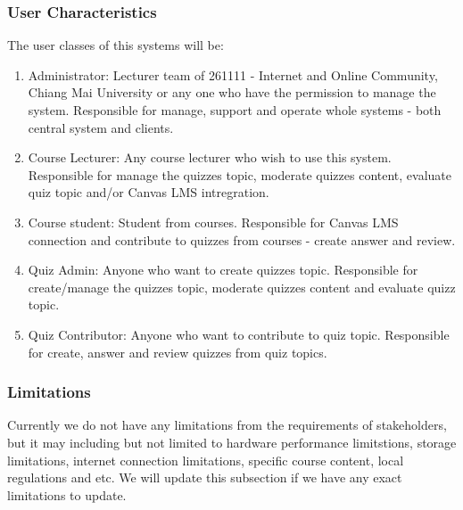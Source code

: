 \documentclass[ 10pt]{report}
\begin{document}
            \subsubsection{User Characteristics}
            The user classes of this systems will be:
            \begin{enumerate}
                \item Administrator: Lecturer team of 261111 - Internet and Online Community, Chiang Mai University or any one who have the permission to manage the system. Responsible for manage, support and operate whole systems - both central system and clients.
                \item Course Lecturer: Any course lecturer who wish to use this system. Responsible for manage the quizzes topic, moderate quizzes content, evaluate quiz topic and/or Canvas LMS intregration.
                \item Course student: Student from courses. Responsible for Canvas LMS connection and contribute to quizzes from courses - create answer and review.  
                \item Quiz Admin: Anyone who want to create quizzes topic. Responsible for create/manage the quizzes topic, moderate quizzes content and evaluate quizz topic.
                \item Quiz Contributor: Anyone who want to contribute to quiz topic. Responsible for create, answer and review quizzes from quiz topics.
            \end{enumerate}
            \subsubsection{Limitations}
            Currently we do not have any limitations from the requirements of stakeholders, but it may including but not limited to hardware performance limitstions, storage limitations, internet connection limitations, specific course content, local regulations and etc. We will update this subsection if we have any exact limitations to update.
\end{document}
